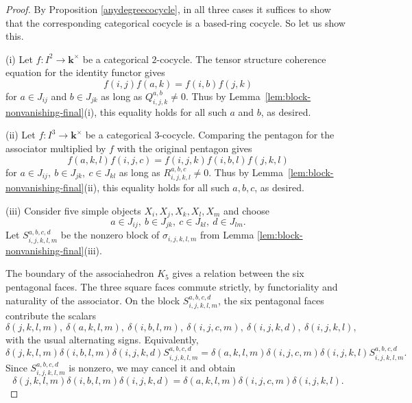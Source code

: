 \documentclass[12pt]{amsart}
\numberwithin{equation}{section}
\theoremstyle{definition}
\newcommand{\1}{_{(1)}}
\newcommand{\2}{_{(2)}}
\newcommand{\3}{_{(3)}}
\newcommand{\4}{_{(4)}}
\newcommand{\5}{_{(5)}}
\newcommand{\6}{_{(6)}}
\theoremstyle{plain}
\theoremstyle{definition}
\theoremstyle{remark}
\def\k{\mathbf{k}}
\begin{document}
\begin{proof} By Proposition \ref{anydegreecocycle}, in all three cases it suffices to show that 
the corresponding categorical cocycle is a based-ring cocycle. So let us show this. 

(i) Let $f:I^2\to \k^\times$ be a categorical $2$-cocycle. The tensor structure coherence equation for the identity functor gives
\begin{equation*}
        f(i,j)f(a,k)=f(i,b)f(j,k)
\end{equation*}
for $a\in J_{ij}$ and $b\in J_{jk}$ as long as $Q_{i,j,k}^{a,b}\ne 0$. Thus by Lemma~\ref{lem:block-nonvanishing-final}(i), this equality holds for all such $a$ and $b$, as desired.

(ii) Let $f:I^3\to \k^\times$ be a categorical $3$-cocycle. Comparing the pentagon for the associator multiplied by $f$ with the original pentagon gives
\begin{equation*}
        f(a,k,l)f(i,j,c)
        =
        f(i,j,k)f(i,b,l)f(j,k,l)
\end{equation*}
for $a\in J_{ij},\  b\in J_{jk},\  c\in J_{kl}$ as long as $R_{i,j,k,l}^{a,b,c}\ne 0$. Thus by Lemma~\ref{lem:block-nonvanishing-final}(ii), this equality holds for all such $a,b,c$, as desired.

(iii) Consider five
simple objects $X_i,X_j,X_k,X_l,X_m$ and choose
\begin{equation*}
        a\in J_{ij},\  b\in J_{jk},\ 
        c\in J_{kl},\  d\in J_{lm}.
\end{equation*}
Let $S_{i,j,k,l,m}^{a,b,c,d}$ be the nonzero block of $\sigma_{i,j,k,l,m}$ from Lemma
\ref{lem:block-nonvanishing-final}(iii).

The boundary of the associahedron
$K_5$ gives a relation between the six pentagonal faces.  The three square
faces commute strictly, by functoriality and naturality of the associator.
On the block $S_{i,j,k,l,m}^{a,b,c,d}$, the six pentagonal faces contribute the
scalars
\begin{equation*}
        \delta(j,k,l,m),\ 
        \delta(a,k,l,m),\ 
        \delta(i,b,l,m),\ 
        \delta(i,j,c,m),\ 
        \delta(i,j,k,d),\ 
        \delta(i,j,k,l),
\end{equation*}
with the usual alternating signs.
  Equivalently, \scriptsize
\begin{equation}\label{eq:K5-block-relation}
        \delta(j,k,l,m)\delta(i,b,l,m)\delta(i,j,k,d)S_{i,j,k,l,m}^{a,b,c,d} 
        =
        \delta(a,k,l,m)\delta(i,j,c,m)\delta(i,j,k,l)S_{i,j,k,l,m}^{a,b,c,d}.
\end{equation} \normalsize
Since $S_{i,j,k,l,m}^{a,b,c,d}$ is nonzero, we may cancel it and obtain
\begin{equation}
\label{eq:Pi-fusion-4-cocycle}
        \delta(j,k,l,m)\delta(i,b,l,m)\delta(i,j,k,d)
        =
        \delta(a,k,l,m)\delta(i,j,c,m)\delta(i,j,k,l).
\end{equation}
\end{proof}
\end{document}

